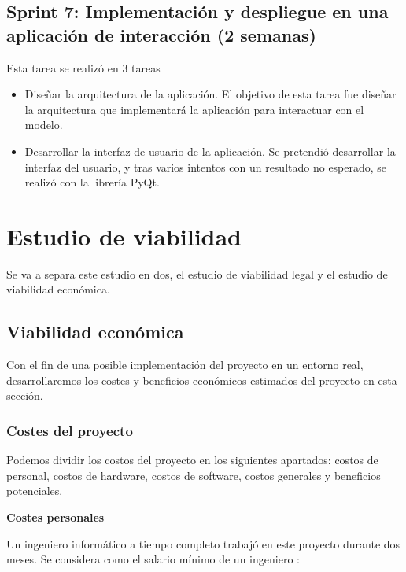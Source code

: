 \subsection{Sprint 7: Implementación y despliegue en una aplicación de interacción (2 semanas)}
Esta tarea se realizó en 3 tareas
\begin{itemize}
    \item Diseñar la arquitectura de la aplicación.
    El objetivo de esta tarea fue diseñar la arquitectura que implementará la aplicación para interactuar con el modelo.
    \item Desarrollar la interfaz de usuario de la aplicación.
    Se pretendió desarrollar la interfaz del usuario, y tras varios intentos con un resultado no esperado, se realizó con la librería PyQt.
\end{itemize}

\section{Estudio de viabilidad}

Se va a separa este estudio en dos, el estudio de viabilidad legal y el estudio de viabilidad económica.

\subsection{Viabilidad económica}

Con el fin de una posible implementación del proyecto en un entorno real, desarrollaremos los costes y beneficios económicos estimados del proyecto en esta sección.

\subsubsection{Costes del proyecto}

Podemos dividir los costos del proyecto en los siguientes apartados: costos de personal, costos de hardware, costos de software, costos generales y beneficios potenciales.

\textbf{Costes personales}

Un ingeniero informático a tiempo completo trabajó en este proyecto durante dos meses. Se considera como el salario mínimo de un ingeniero \cite{salariogob}:

